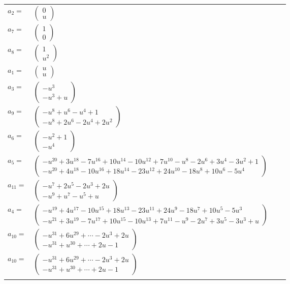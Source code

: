 \documentclass[1p]{elsarticle_modified}
\theoremstyle{definition}
\begin{document}
\begin{tabular}{m{7pt} m{180pt} m{7pt} m{180pt} }
\flushright $a_{2}=$&$\begin{pmatrix}0\\u\end{pmatrix}$ \\
\flushright $a_{7}=$&$\begin{pmatrix}1\\0\end{pmatrix}$ \\
\flushright $a_{8}=$&$\begin{pmatrix}1\\u^2\end{pmatrix}$ \\
\flushright $a_{1}=$&$\begin{pmatrix}u\\u\end{pmatrix}$ \\
\flushright $a_{3}=$&$\begin{pmatrix}- u^3\\- u^3+u\end{pmatrix}$ \\
\flushright $a_{9}=$&$\begin{pmatrix}- u^8+u^6- u^4+1\\- u^8+2 u^6-2 u^4+2 u^2\end{pmatrix}$ \\
\flushright $a_{6}=$&$\begin{pmatrix}- u^2+1\\- u^4\end{pmatrix}$ \\
\flushright $a_{5}=$&$\begin{pmatrix}- u^{20}+3 u^{18}-7 u^{16}+10 u^{14}-10 u^{12}+7 u^{10}- u^8-2 u^6+3 u^4-3 u^2+1\\- u^{20}+4 u^{18}-10 u^{16}+18 u^{14}-23 u^{12}+24 u^{10}-18 u^8+10 u^6-5 u^4\end{pmatrix}$ \\
\flushright $a_{11}=$&$\begin{pmatrix}- u^7+2 u^5-2 u^3+2 u\\- u^9+u^7- u^5+u\end{pmatrix}$ \\
\flushright $a_{4}=$&$\begin{pmatrix}- u^{19}+4 u^{17}-10 u^{15}+18 u^{13}-23 u^{11}+24 u^9-18 u^7+10 u^5-5 u^3\\- u^{21}+3 u^{19}-7 u^{17}+10 u^{15}-10 u^{13}+7 u^{11}- u^9-2 u^7+3 u^5-3 u^3+u\end{pmatrix}$ \\
\flushright $a_{10}=$&$\begin{pmatrix}- u^{31}+6 u^{29}+\cdots-2 u^3+2 u\\- u^{31}+u^{30}+\cdots+2 u-1\end{pmatrix}$\\ \flushright $a_{10}=$&$\begin{pmatrix}- u^{31}+6 u^{29}+\cdots-2 u^3+2 u\\- u^{31}+u^{30}+\cdots+2 u-1\end{pmatrix}$\\&\end{tabular}
\end{document}
